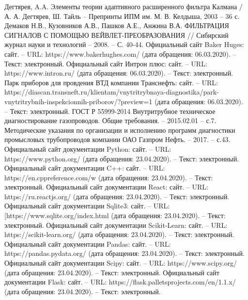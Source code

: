 \documentclass[a4paper,article,14pt]{extarticle}
\begin{document}
\begin{thebibliography}{1}
 Дегтярев, A.A. Элементы теории адаптивного расширенного фильтра Калмана / А. А. Дегтярев, Ш. Тайль – Препринты ИПМ им. М. В. Келдыша, 2003 – 36 с.
 Демаков Н.В., Кузовников А.В., Пашков А.Е., Анжина В.А.  ФИЛЬТРАЦИЯ СИГНАЛОВ С ПОМОЩЬЮ ВЕЙВЛЕТ-ПРЕОБРАЗОВАНИЯ // Сибирский журнал науки и технологий – 2008.  – С. 40-44.
 Официальный сайт \flqq Baker Huges\frqq: сайт. – URL: https://www.bakerhughes.com/ (дата обращения: 06.03.2020). – Текст: электронный.
 Официальный сайт \flqq Интрон плюс\frqq: сайт. – URL: https://www.intron.ru/ (дата обращения: 06.03.2020). – Текст: электронный.
 Парк приборов для провдения ВТД компании \flqq Транснефть\frqq: сайт. – URL: https://diascan.transneft.ru/klientam/vnytritrybnaya-diagnostika/park-vnytritrybnih-inspekcionnih-priborov/?preview=1 (дата обращения: 06.03.2020). – Текст: электронный.
 ГОСТ Р 55999-2014 Внутритрубное техническое диагностирование газопроводов. Общие требования. – 2015.02.01 – с.7.
 Методические указания по организации и исполнению программ диагностики промысловых трубопроводов компании ОАО  \flqq Газпром Нефть\frqq. – 2017. – с.43.
 Официальный сайт документации Python: сайт. – URL: https://www.python.org/ (дата обращения: 23.04.2020). – Текст: электронный.
 Официальный сайт документации C++: сайт. – URL: https://en.cppreference.com/w (дата обращения: 23.04.2020). – Текст: электронный.
 Официальный сайт документации React: сайт. – URL: https://ru.reactjs.org/ (дата обращения: 23.04.2020). – Текст: электронный.
 Официальный сайт документации Sqlite3: сайт. – URL: [https://www.sqlite.org/index.html (дата обращения: 23.04.2020). – Текст: электронный.
 Официальный сайт документации Scikit-Learn: сайт. – URL: https://scikit-learn.org/ (дата обращения: 23.04.2020). – Текст: электронный.
 Официальный сайт документации Pandas: сайт. – URL: https://pandas.pydata.org/ (дата обращения: 23.04.2020). – Текст: электронный.
 Официальный сайт документации Scipy: сайт. – URL: https://www.scipy.org/ (дата обращения: 23.04.2020). – Текст: электронный.
 Официальный сайт документации Flask: сайт. – URL: https://flask.palletsprojects.com/en/1.1.x/ (дата обращения: 23.04.2020). – Текст: электронный.

\end{thebibliography}
\end{document}
